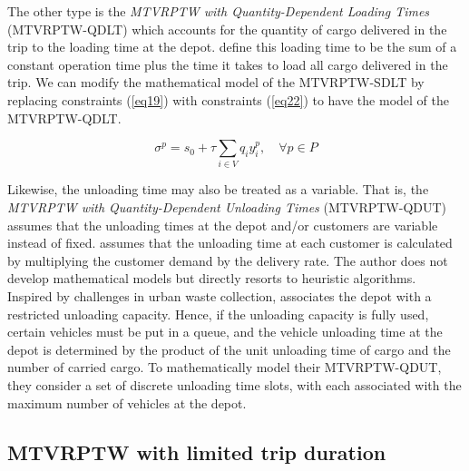 The other type is the \textit{MTVRPTW with Quantity-Dependent Loading Times} (MTVRPTW-QDLT) which accounts for the quantity of cargo delivered in the trip to the loading time at the depot.  \cite{battarra2009adaptive} define this loading time to be the sum of a constant operation time plus the time it takes to load all cargo delivered in the trip.  We can modify the mathematical model of the MTVRPTW-SDLT by replacing constraints (\ref{eq19}) with constraints (\ref{eq22}) to have the model of the MTVRPTW-QDLT.

\begin{equation} \label{eq22}
    \sigma^p = s_0 + \tau \sum_{i \in V} q_i y^p_i, \quad \forall p \in P
\end{equation}

Likewise, the unloading time may also be treated as a variable. That is, the \textit{MTVRPTW with Quantity-Dependent Unloading Times} (MTVRPTW-QDUT) assumes that the unloading times at the depot and/or customers are variable instead of fixed.  \cite{karoonsoontawong2015efficient} assumes that the unloading time at each customer is calculated by multiplying the customer demand by the delivery rate.  The author does not develop mathematical models but directly resorts to heuristic algorithms.  Inspired by challenges in urban waste collection, \cite{huang2021multi} associates the depot with a restricted unloading capacity.  Hence, if the unloading capacity is fully used, certain vehicles must be put in a queue, and the vehicle unloading time at the depot is determined by the product of the unit unloading time of cargo and the number of carried cargo.  To mathematically model their MTVRPTW-QDUT, they consider a set of discrete unloading time slots, with each associated with the maximum number of vehicles at the depot.

\subsection{MTVRPTW with limited trip duration}


